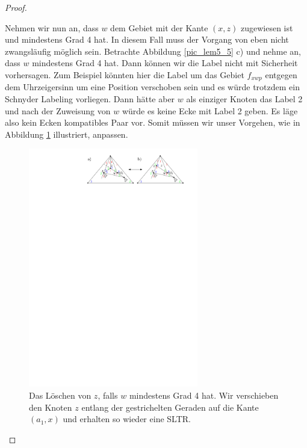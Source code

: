 \begin{proof}
\begin{description}[leftmargin =0pt, font = \rmfamily ]
Nehmen wir nun an, dass $w$ dem Gebiet mit der Kante $(x,z)$ zugewiesen ist und mindestens Grad 4 hat. In diesem Fall muss der Vorgang von eben nicht zwangsläufig möglich sein. Betrachte Abbildung \ref{pic_lem5_5} c) und nehme an, dass $w$ mindestens Grad 4 hat. Dann können wir die Label nicht mit Sicherheit vorhersagen. Zum Beispiel könnten hier die Label um das Gebiet $f_{xwp}$ entgegen dem Uhrzeigersinn um eine Position verschoben sein und es würde trotzdem ein Schnyder Labeling vorliegen. Dann hätte aber $w$ als einziger Knoten das Label 2 und nach der Zuweisung von $w$ würde es keine Ecke mit Label 2 geben. Es läge also kein Ecken kompatibles Paar vor. Somit müssen wir unser Vorgehen, wie in Abbildung \ref{pic_lem5_6} illustriert, anpassen.

\begin{figure}[h]
	\centering
	  \includegraphics[width=0.66\textwidth]{lem5_6.pdf}
    	\caption{Das Löschen von $z$, falls $w$ mindestens Grad 4 hat. Wir verschieben den Knoten $z$ entlang der gestrichelten Geraden auf die Kante $(a_1,x)$ und erhalten so wieder eine SLTR.}
    	\label{pic_lem5_6}
\end{figure}


\end{description}
\end{proof}
